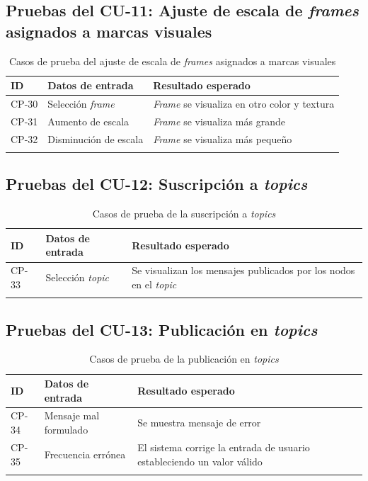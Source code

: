 \newpage
\subsection{Pruebas del CU-11: Ajuste de escala de \textit{frames} asignados a marcas visuales}
\begin{longtable}{|p{1.5cm}|p{4cm}|p{4cm}|}
\hline
\textbf{ID} & \textbf{Datos de entrada} & \textbf{Resultado esperado} \\
\hline
CP-30 & Selección \textit{frame} & \textit{Frame} se visualiza en otro color y textura \\
\hline
CP-31 & Aumento de escala & \textit{Frame} se visualiza más grande \\
\hline
CP-32 & Disminución de escala & \textit{Frame} se visualiza más pequeño \\
\hline
\caption{Casos de prueba del ajuste de escala de \textit{frames} asignados a marcas visuales}
\end{longtable}

\subsection{Pruebas del CU-12: Suscripción a \textit{topics}}
\begin{longtable}{|p{1.5cm}|p{4cm}|p{4cm}|}
\hline
\textbf{ID} & \textbf{Datos de entrada} & \textbf{Resultado esperado} \\
\hline
CP-33 & Selección \textit{topic} & Se visualizan los mensajes publicados por los nodos en el \textit{topic} \\
\hline
\caption{Casos de prueba de la suscripción a \textit{topics}}
\end{longtable}

\subsection{Pruebas del CU-13: Publicación en \textit{topics}}
\begin{longtable}{|p{1.5cm}|p{4cm}|p{4cm}|}
\hline
\textbf{ID} & \textbf{Datos de entrada} & \textbf{Resultado esperado} \\
\hline
CP-34 & Mensaje mal formulado & Se muestra mensaje de error \\
\hline
CP-35 & Frecuencia errónea & El sistema corrige la entrada de usuario estableciendo un valor válido \\
\hline
\caption{Casos de prueba de la publicación en \textit{topics}}
\end{longtable}

